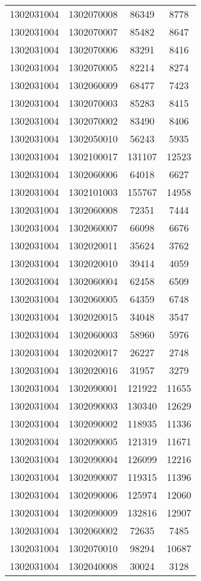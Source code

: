 \begin{longtable}[h]{llcc}
		1302031004 & 1302070008 & 86349 & 8778\\
		1302031004 & 1302070007 & 85482 & 8647\\
		1302031004 & 1302070006 & 83291 & 8416\\
		1302031004 & 1302070005 & 82214 & 8274\\
		1302031004 & 1302060009 & 68477 & 7423\\
		1302031004 & 1302070003 & 85283 & 8415\\
		1302031004 & 1302070002 & 83490 & 8406\\
		1302031004 & 1302050010 & 56243 & 5935\\
		1302031004 & 1302100017 & 131107 & 12523\\
		1302031004 & 1302060006 & 64018 & 6627\\
		1302031004 & 1302101003 & 155767 & 14958\\
		1302031004 & 1302060008 & 72351 & 7444\\
		1302031004 & 1302060007 & 66098 & 6676\\
		1302031004 & 1302020011 & 35624 & 3762\\
		1302031004 & 1302020010 & 39414 & 4059\\
		1302031004 & 1302060004 & 62458 & 6509\\
		1302031004 & 1302060005 & 64359 & 6748\\
		1302031004 & 1302020015 & 34048 & 3547\\
		1302031004 & 1302060003 & 58960 & 5976\\
		1302031004 & 1302020017 & 26227 & 2748\\
		1302031004 & 1302020016 & 31957 & 3279\\
		1302031004 & 1302090001 & 121922 & 11655\\
		1302031004 & 1302090003 & 130340 & 12629\\
		1302031004 & 1302090002 & 118935 & 11336\\
		1302031004 & 1302090005 & 121319 & 11671\\
		1302031004 & 1302090004 & 126099 & 12216\\
		1302031004 & 1302090007 & 119315 & 11396\\
		1302031004 & 1302090006 & 125974 & 12060\\
		1302031004 & 1302090009 & 132816 & 12907\\
		1302031004 & 1302060002 & 72635 & 7485\\
		1302031004 & 1302070010 & 98294 & 10687\\
		1302031004 & 1302040008 & 30024 & 3128\\

\end{longtable}
